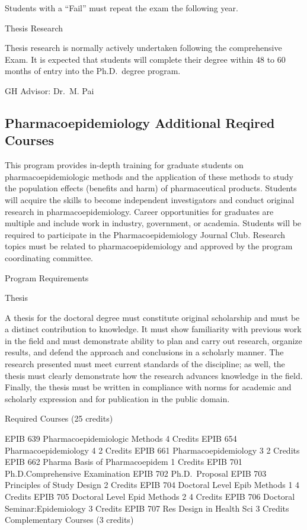 \documentclass[
]{book}
\begin{document}
Students with a ``Fail'' must repeat the exam the following year.

Thesis Research

Thesis research is normally actively undertaken following the comprehensive Exam. It is expected that students will complete their degree within 48 to 60 months of entry into the Ph.D.~degree program.

GH Advisor:
Dr.~M. Pai

\hypertarget{pharmacoepidemiology-additional-reqired-courses}{%
\subsection{Pharmacoepidemiology Additional Reqired Courses}\label{pharmacoepidemiology-additional-reqired-courses}}

This program provides in-depth training for graduate students on pharmacoepidemiologic methods and the application of these methods to study the population effects (benefits and harm) of pharmaceutical products. Students will acquire the skills to become independent investigators and conduct original research in pharmacoepidemiology. Career opportunities for graduates are multiple and include work in industry, government, or academia. Students will be required to participate in the Pharmacoepidemiology Journal Club. Research topics must be related to pharmacoepidemiology and approved by the program coordinating committee.

Program Requirements

Thesis

A thesis for the doctoral degree must constitute original scholarship and must be a distinct contribution to knowledge. It must show familiarity with previous work in the field and must demonstrate ability to plan and carry out research, organize results, and defend the approach and conclusions in a scholarly manner. The research presented must meet current standards of the discipline; as well, the thesis must clearly demonstrate how the research advances knowledge in the field. Finally, the thesis must be written in compliance with norms for academic and scholarly expression and for publication in the public domain.

Required Courses (25 credits)

EPIB 639 Pharmacoepidemiologic Methods 4 Credits
EPIB 654 Pharmacoepidemiology 4 2 Credits
EPIB 661 Pharmacoepidemiology 3 2 Credits
EPIB 662 Pharma Basis of Pharmacoepidem 1 Credits
EPIB 701 Ph.D.Comprehensive Examination
EPIB 702 Ph.D.~Proposal
EPIB 703 Principles of Study Design 2 Credits
EPIB 704 Doctoral Level Epib Methods 1 4 Credits
EPIB 705 Doctoral Level Epid Methods 2 4 Credits
EPIB 706 Doctoral Seminar:Epidemiology 3 Credits
EPIB 707 Res Design in Health Sci 3 Credits
Complementary Courses (3 credits)
\end{document}
